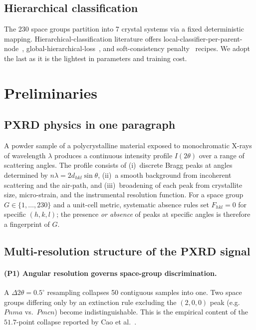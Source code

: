 \documentclass[final]{ws-ijwmip}
\begin{document}
\subsection{Hierarchical classification}

The 230 space groups partition into 7 crystal systems via a fixed
deterministic mapping. Hierarchical-classification literature offers
local-classifier-per-parent-node~\cite{silla2011hier},
global-hierarchical-loss~\cite{deng2014hier}, and soft-consistency
penalty~\cite{barz2019hier} recipes. We adopt the last as it is the
lightest in parameters and training cost.


\section{Preliminaries}
\label{sec:prelim}


\subsection{PXRD physics in one paragraph}

A powder sample of a polycrystalline material exposed to monochromatic
X-rays of wavelength $\lambda$ produces a continuous intensity profile
$I(2\theta)$ over a range of scattering angles. The profile consists of
(i)~discrete Bragg peaks at angles determined by
$n\lambda=2d_{hkl}\sin\theta$, (ii)~a smooth background from incoherent
scattering and the air-path, and (iii)~broadening of each peak from
crystallite size, micro-strain, and the instrumental resolution function.
For a space group $G\in\{1,\dots,230\}$ and a unit-cell metric, systematic
absence rules set $F_{hkl}=0$ for specific $(h,k,l)$; the presence
\emph{or absence} of peaks at specific angles is therefore a fingerprint
of $G$.


\subsection{Multi-resolution structure of the PXRD signal}

\paragraph{(P1) Angular resolution governs space-group discrimination.}
A $\Delta 2\theta = 0.5^\circ$ resampling collapses 50 contiguous samples
into one. Two space groups differing only by an extinction rule excluding
the $(2,0,0)$ peak (e.g.\ $Pnma$ vs.\ $Pmcn$) become indistinguishable.
This is the empirical content of the $51.7$-point collapse reported
by Cao et al.~\cite{caobin2025simxrd}.
\end{document}
